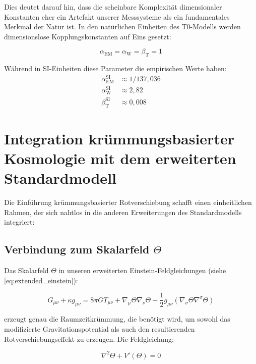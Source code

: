 \documentclass[12pt,a4paper]{article}
\newcommand{\alphaEM}{\alpha_{\text{EM}}}
\newcommand{\alphaW}{\alpha_{\text{W}}}
\newcommand{\betaT}{\beta_{\text{T}}}
\begin{document}
	Dies deutet darauf hin, dass die scheinbare Komplexität dimensionaler Konstanten eher ein Artefakt unserer Messsysteme als ein fundamentales Merkmal der Natur ist\cite{duff2002}. In den natürlichen Einheiten des T0-Modells\cite{pascher_alpha_2025, pascher_alphabeta_2025} werden dimensionslose Kopplungskonstanten auf Eins gesetzt:
	
	\begin{equation}
		\label{eq:dimensionless_unity}
		\alphaEM = \alphaW = \betaT = 1
	\end{equation}
	
	Während in SI-Einheiten diese Parameter die empirischen Werte haben\cite{mohr2018, pascher_params_2025}:
	\begin{align}
		\alphaEM^{\text{SI}} &\approx 1/137,036 \\
		\alphaW^{\text{SI}} &\approx 2,82 \\
		\betaT^{\text{SI}} &\approx 0,008
	\end{align}
	
	\section{Integration krümmungsbasierter Kosmologie mit dem erweiterten Standardmodell}
	\label{sec:integration}
	
	Die Einführung krümmungsbasierter Rotverschiebung schafft einen einheitlichen Rahmen, der sich nahtlos in die anderen Erweiterungen des Standardmodells integriert:
	
	\subsection{Verbindung zum Skalarfeld $\Theta$}
	\label{subsec:theta_connection}
	
	Das Skalarfeld $\Theta$ in unseren erweiterten Einstein-Feldgleichungen (siehe \cref{eq:extended_einstein}):
	
	\begin{equation}
		G_{\mu\nu} + \kappa g_{\mu\nu} = 8\pi G T_{\mu\nu} + \nabla_{\mu}\Theta\nabla_{\nu}\Theta - \frac{1}{2}g_{\mu\nu}(\nabla_{\sigma}\Theta\nabla^{\sigma}\Theta)
	\end{equation}
	
	erzeugt genau die Raumzeitkrümmung, die benötigt wird, um sowohl das modifizierte Gravitationspotential als auch den resultierenden Rotverschiebungseffekt zu erzeugen\cite{pascher_emergente_gravitation_2025}. Die Feldgleichung:
	
	\begin{equation}
		\label{eq:theta_field_eq}
		\nabla^2\Theta + V'(\Theta) = 0
	\end{equation}
	
\end{document}
